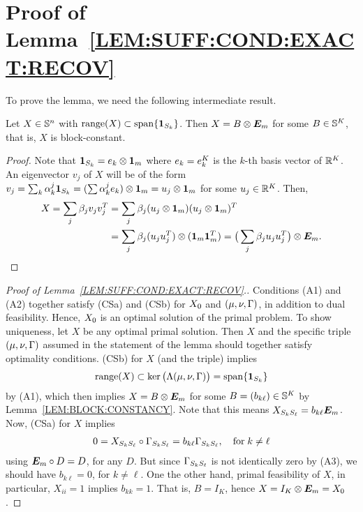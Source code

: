 \section{Proof of Lemma~\ref{LEM:SUFF:COND:EXACT:RECOV}}\label{sec:proof:suff:cond:exact:recov}
To prove the lemma, we need the following intermediate result.
\begin{lem}\label{LEM:BLOCK:CONSTANCY}
  Let $X\in\mathbb{S}^{n}$ with $\operatorname{range}(X) \subset \operatorname{span}\{\bm{1}_{S_{k}}\}$. Then $X = B \otimes \bm{E}_m$ for some $B \in \mathbb{S}^{K}$, that is, $X$ is block-constant.
\end{lem}
\begin{proof}
   Note that $\bm{1}_{S_{k}} = e_{k} \otimes \bm{1}_m$ where $e_{k} = e_{k}^{K}$ is the $k$-th basis vector of $\mathbb{R}^K$.
  An eigenvector $v_j$ of $X$ will be of the form $v_j = \sum_k \alpha_k^j \bm{1}_{S_{k}} = (\sum \alpha_k^j e_{k}) \otimes \bm{1}_m = u_j \otimes \bm{1}_m$  for some $u_j \in \mathbb{R}^K$. Then,
  \begin{align*}
    X = \sum_j \beta_j v_j v_j^T 
      &= \sum_j \beta_j (u_j \otimes \bm{1}_m) (u_j \otimes \bm{1}_m)^T \\
      &= \sum_j \beta_j (u_j u_j^T) \otimes(\bm{1}_m \bm{1}_m^T) = \big(\sum_j \beta_j u_j u_j^T\big) \otimes \bm{E}_m.
   \end{align*} 

\end{proof}

\begin{proof}[Proof of Lemma~\ref{LEM:SUFF:COND:EXACT:RECOV}.]
  Conditions (A1) and (A2) together satisfy (CSa) and (CSb) for $X_0$ and $(\mu,\nu,\Gamma)$, in addition to dual feasibility. Hence, $X_0$ is an optimal solution of the primal problem. To show uniqueness, let $X$ be any optimal primal solution. Then $X$ and the specific triple $(\mu,\nu,\Gamma)$ assumed in the statement of the lemma should together satisfy optimality conditions. (CSb) for $X$ (and the triple) implies 
  \begin{align*}
    \operatorname{range}(X) \subset \ker\big(\Lambda(\mu,\nu,\Gamma)\big) = \operatorname{span}\{\bm{1}_{S_{k}}\}
  \end{align*}
  by (A1), which then implies $X = B \otimes \bm{E}_m$ for some $B = (b_{k \ell})\in \mathbb{S}^{K}$ by Lemma~\ref{LEM:BLOCK:CONSTANCY}. 
  Note that this means $X_{S_{k} S_{\ell}} = b_{k \ell} \bm{E}_m$.
  Now, (CSa) for $X$ implies
  \begin{align*}
    0 = X_{S_{k}S_{\ell}}  \circ \Gamma_{S_{k}S_{\ell}} = b_{k \ell} \Gamma_{S_{k}S_{\ell}}, \quad \text{for}\; k \neq \ell
  \end{align*}
  using $\bm{E}_m \circ D = D$, for any $D$. But since $\Gamma_{S_{k}S_{\ell}}$ is not identically zero by (A3), we should have $b_{k\ell} = 0$, for $k\neq \ell$. One the other hand, primal feasibility of $X$, in particular, $X_{ii} = 1$ implies $b_{kk} = 1$. That is, $B = I_K$, hence $X = I_K \otimes \bm{E}_m = X_0$.
\end{proof} 






